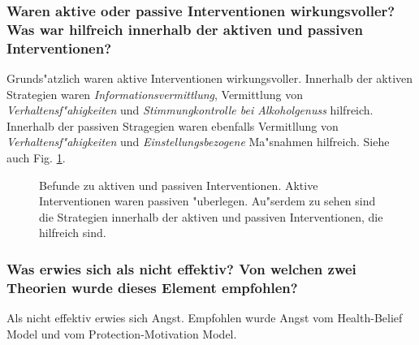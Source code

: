 \subsubsection{Waren aktive oder passive Interventionen wirkungsvoller? Was war hilfreich innerhalb der aktiven und passiven Interventionen?}
Grunds"atzlich waren aktive Interventionen wirkungsvoller. Innerhalb der aktiven Strategien waren \emph{Informationsvermittlung}, Vermittlung von \emph{Verhaltensf"ahigkeiten} und \emph{Stimmungkontrolle bei Alkoholgenuss} hilfreich. Innerhalb der passiven Stragegien waren ebenfalls Vermitllung von \emph{Verhaltensf"ahigkeiten} und \emph{Einstellungsbezogene} Ma"snahmen hilfreich. Siehe auch Fig. \ref{fig:albarracin1}.
\begin{figure}[h!]
        \begin{center}
        \end{center}
        \caption{Befunde zu aktiven und passiven Interventionen. Aktive Interventionen waren passiven "uberlegen. Au"serdem zu sehen sind die Strategien innerhalb der aktiven und passiven Interventionen, die hilfreich sind.}
        \label{fig:albarracin1}
\end{figure}

\subsubsection{Was erwies sich als nicht effektiv? Von welchen zwei Theorien wurde dieses Element empfohlen?}
Als nicht effektiv erwies sich Angst. Empfohlen wurde Angst vom Health-Belief Model und vom Protection-Motivation Model.

